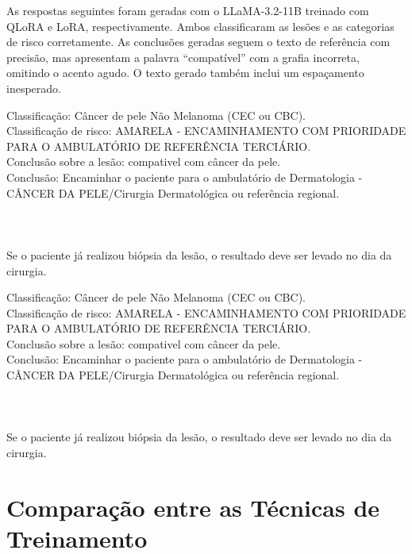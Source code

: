 As respostas seguintes foram geradas com o \ac{LLaMA}-3.2-11B treinado com \ac{QLoRA} e \ac{LoRA}, respectivamente.
Ambos classificaram as lesões e as categorias de risco corretamente. As conclusões geradas seguem o texto de referência
com precisão, mas apresentam a palavra ``compatível'' com a grafia incorreta, omitindo o acento agudo. O texto gerado
também inclui um espaçamento inesperado.

\begin{dialogue}
     Classificação: Câncer de pele Não Melanoma (CEC ou CBC). \\
    Classificação de risco: AMARELA - ENCAMINHAMENTO COM PRIORIDADE PARA O AMBULATÓRIO DE REFERÊNCIA TERCIÁRIO. \\
    Conclusão sobre a lesão: compativel com câncer da pele. \\
    Conclusão: Encaminhar o paciente para o ambulatório de Dermatologia - CÂNCER DA PELE/Cirurgia Dermatológica ou
    referência regional. \\ \\ \\ \\
    Se o paciente já realizou biópsia da lesão, o resultado deve ser levado no dia da cirurgia.
\end{dialogue}

\begin{dialogue}
     Classificação: Câncer de pele Não Melanoma (CEC ou CBC). \\
    Classificação de risco: AMARELA - ENCAMINHAMENTO COM PRIORIDADE PARA O AMBULATÓRIO DE REFERÊNCIA TERCIÁRIO. \\
    Conclusão sobre a lesão: compativel com câncer da pele. \\
    Conclusão: Encaminhar o paciente para o ambulatório de Dermatologia - CÂNCER DA PELE/Cirurgia Dermatológica ou
    referência regional. \\ \\ \\ \\
    Se o paciente já realizou biópsia da lesão, o resultado deve ser levado no dia da cirurgia.
\end{dialogue}

\section{Comparação entre as Técnicas de Treinamento}

